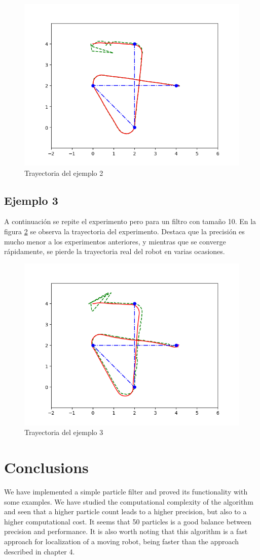\begin{figure}[htb]
  \centering
  \includegraphics[width=.8\linewidth]{images/filtro9.png}
  \caption{Trayectoria del ejemplo 2}
  \label{fig:ejemplo9}
\end{figure}
\subsection{Ejemplo 3}
A continuación se repite el experimento pero para un filtro con tamaño 10.
En la figura \ref{fig:ejemplo10} se observa la trayectoria del experimento. Destaca que la precisión es mucho menor a los experimentos anteriores, y mientras que se converge rápidamente, 
se pierde la trayectoria real del robot en varias ocasiones.
\begin{figure}[htb]
  \centering
  \includegraphics[width=.8\linewidth]{images/filtro10.png}
  \caption{Trayectoria del ejemplo 3}
  \label{fig:ejemplo10}
\end{figure}
\section{Conclusions}
We have implemented a simple particle filter and proved its functionality with some examples. We have studied the computational complexity of the algorithm and seen that
a higher particle count leads to a higher precision, but also to a higher computational cost. It seems that 50 particles is a good balance between precision and performance.
It is also worth noting that this algorithm is a fast approach for localization of a moving robot, being faster than the approach described in chapter 4.

